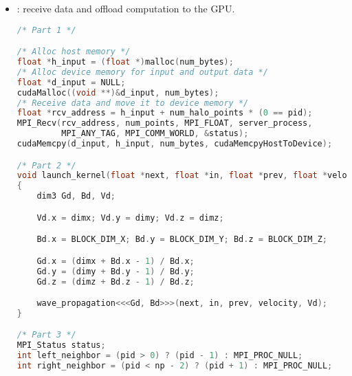 \begin{itemize}
\begin{lstlisting}[language=C++]
/* Collect output data */
MPI_Status status;
for (int process = 0; process < num_comp_nodes; process++) {
    MPI_Recv(output + process * num_points / num_comp_nodes, num_points / num_comp_nodes, MPI_FLOAT, process, DATA_COLLECT, MPI_COMM_WORLD, &status);
}\end{lstlisting}

    The server process first initializes MPI and determines the total number of MPI processes and the number of compute nodes. It also allocates and initializes the input data and calculates the number of points per compute process.

    After that, the server process uses a loop to send data to each compute node.

    It calls \texttt{MPI\_Barrier} to synchronize all processes. This ensures that all compute nodes have completed their calculations before continuing.

    Finally, the server process uses another loop to receive the computed results from each compute node.


    \item {}: receive data and offload computation to the GPU.
    \begin{lstlisting}[language=C++]
/* Part 1 */

/* Alloc host memory */
float *h_input = (float *)malloc(num_bytes);
/* Alloc device memory for input and output data */
float *d_input = NULL;
cudaMalloc((void **)&d_input, num_bytes);
/* Receive data and move it to device memory */
float *rcv_address = h_input + num_halo_points * (0 == pid);
MPI_Recv(rcv_address, num_points, MPI_FLOAT, server_process,
         MPI_ANY_TAG, MPI_COMM_WORLD, &status);
cudaMemcpy(d_input, h_input, num_bytes, cudaMemcpyHostToDevice);

/* Part 2 */
void launch_kernel(float *next, float *in, float *prev, float *velocity, int dimx, int dimy, int dimz)
{
    dim3 Gd, Bd, Vd;

    Vd.x = dimx; Vd.y = dimy; Vd.z = dimz;

    Bd.x = BLOCK_DIM_X; Bd.y = BLOCK_DIM_Y; Bd.z = BLOCK_DIM_Z;

    Gd.x = (dimx + Bd.x - 1) / Bd.x;
    Gd.y = (dimy + Bd.y - 1) / Bd.y;
    Gd.z = (dimz + Bd.z - 1) / Bd.z;

    wave_propagation<<<Gd, Bd>>>(next, in, prev, velocity, Vd);
}

/* Part 3 */
MPI_Status status;
int left_neighbor = (pid > 0) ? (pid - 1) : MPI_PROC_NULL;
int right_neighbor = (pid < np - 2) ? (pid + 1) : MPI_PROC_NULL;


\end{lstlisting}
\end{itemize}
